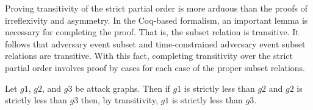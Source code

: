 \documentclass[runningheads]{llncs}
\theoremstyle{definition}
\begin{document}
\noindent Proving transitivity of the strict partial order is more arduous than the proofs of irreflexivity and asymmetry. In the Coq-based formalism, an important lemma is necessary for completing the proof. That is, the subset relation is transitive. It follows that adversary event subset and time-constrained adversary event subset relations are transitive. With this fact, completing transitivity over the strict partial order involves proof by cases for each case of the proper subset relations.

\begin{theorem}
    Let $g1$, $g2$, and $g3$ be attack graphs. Then if $g1$ is strictly less than $g2$ and $g2$ is strictly less than $g3$ then, by transitivity, $g1$ is strictly less than $g3$. 
\end{theorem}
\end{document}
